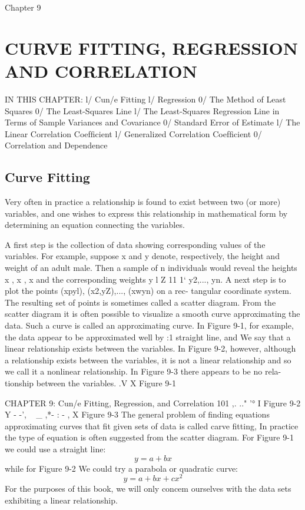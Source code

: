 
Chapter 9
\chapter{CURVE FITTING, REGRESSION AND CORRELATION}
IN THIS CHAPTER:
l/ Cun/e Fitting
l/ Regression
0/ The Method of Least Squares
0/ The Least-Squares Line
l/ The Least-Squares Regression Line
in Terms of Sample Variances
and Covariance
0/ Standard Error of Estimate
l/ The Linear Correlation Coefﬁcient
l/ Generalized Correlation Coefﬁcient
0/ Correlation and Dependence



\section{Curve Fitting}
Very often in practice a relationship is found
to exist between two (or more) variables, and one wishes to express this relationship
in mathematical form by determining an equation connecting the variables.

A ﬁrst step is the collection of data showing corresponding values of the variables. For example, suppose x and y denote, respectively, the height and weight of an adult male. Then a sample of n individuals
would reveal the heights x , x ,  x and the corresponding weights y
l Z 11 1‘
y2,..., yn.
A next step is to plot the points (xpyl), (x2,yZ),..., (xwyn) on a rec-
tangular coordinate system. The resulting set of points is sometimes
called a scatter diagram.
From the scatter diagram it is often possible to visualize a smooth
curve approximating the data. Such a curve is called an approximating
curve. In Figure 9-1, for example, the data appear to be approximated
well by :1 straight line, and We say that a linear relationship exists
between the variables. In Figure 9-2, however, although a relationship
exists between the variables, it is not a linear relationship and so we call
it a nonlinear relationship. In Figure 9-3 there appears to be no rela-
tionship between the variables.
.V
X
Figure 9-1



CHAPTER 9: Cun/e Fitting, Regression, and Correlation 101
,.
.." '°
I
Figure 9-2
Y
- -',
~ _ ,*-
: - ,
X
Figure 9-3
The general problem of ﬁnding equations approximating curves
that ﬁt given sets of data is called carve ﬁtting, In practice the type of
equation is often suggested from the scatter diagram. For Figure 9-1 we
could use a straight line:
\[y = a + bx\]
while for Figure 9-2 We could try a parabola or quadratic curve:
\[y = a + bx + cx^2\]
For the purposes of this book, we will only concem ourselves with
the data sets exhibiting a linear relationship.

